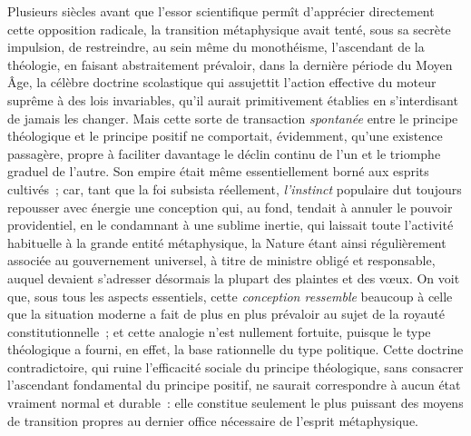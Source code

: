 \documentclass[french,twoside]{book} %
\begin{document}
Plusieurs siècles avant que l’essor scientifique permît d’apprécier directement cette opposition radicale, la transition métaphysique avait tenté, sous sa secrète impulsion, de restreindre, au sein même du monothéisme, l’ascendant de la théologie, en faisant abstraitement prévaloir, dans la dernière période du Moyen Âge, la célèbre doctrine scolastique qui assujettit l’action effective du moteur suprême à des lois invariables, qu’il aurait primitivement établies en s’interdisant de jamais les changer. Mais cette sorte de transaction {\itshape spontanée} entre le principe théologique et le principe positif ne comportait, évidemment, qu’une existence passagère, propre à faciliter davantage le déclin continu de l’un et le triomphe graduel de l’autre. Son empire était même essentiellement borné aux esprits cultivés ; car, tant que la foi subsista réellement, {\itshape l’instinct} populaire dut toujours repousser avec énergie une conception qui, au fond, tendait à annuler le pouvoir providentiel, en le condamnant à une sublime inertie, qui laissait toute l’activité habituelle à la grande entité métaphysique, la Nature étant ainsi régulièrement associée au gouvernement universel, à titre de ministre obligé et responsable, auquel devaient s’adresser désormais la plupart des plaintes et des vœux. On voit que, sous tous les aspects essentiels, cette {\itshape conception ressemble} beaucoup à celle que la situation moderne a fait de plus en plus prévaloir au sujet de la royauté constitutionnelle ; et cette analogie n’est nullement fortuite, puisque le type théologique a fourni, en effet, la base rationnelle du type politique. Cette doctrine contradictoire, qui ruine l’efficacité sociale du principe théologique, sans consacrer l’ascendant fondamental du principe positif, ne saurait correspondre à aucun état vraiment normal et durable : elle constitue seulement le plus puissant des moyens de transition propres au dernier office nécessaire de l’esprit métaphysique.\par
\end{document}
